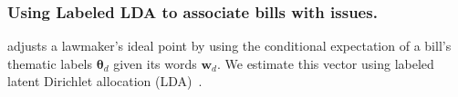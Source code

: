 



\subsubsection{Using Labeled LDA to associate bills with issues.}
\label{sec:lda}

 adjusts a lawmaker's ideal
point by using the conditional expectation of a bill's thematic labels
$\bm \theta_d$ given its words $\bm w_d$.  We estimate this vector
using labeled latent Dirichlet allocation (LDA)~\cite{ramage:2009}.

